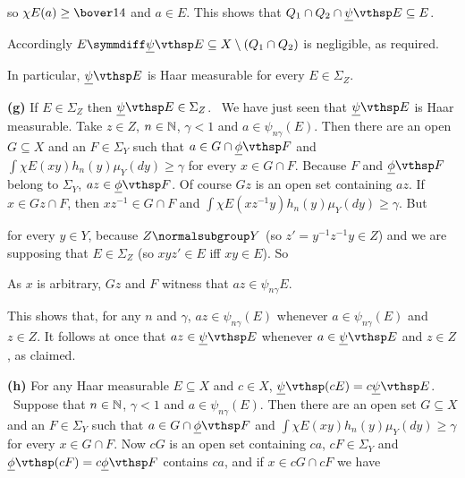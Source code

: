 {

\noindent so $\chi E(a)\ge\bover14$ and $a\in E$.   This shows that
$Q_1\cap Q_2\cap\undpsi E\subseteq E$.

Accordingly $E\symmdiff\undpsi E\subseteq X\setminus(Q_1\cap Q_2)$ is
negligible, as required.\ \QeD\

In particular, $\undpsi E$ is Haar measurable for every $E\in\Sigma_Z$.

\medskip

{\bf (g)} If $E\in\Sigma_Z$ then $\undpsi E\in\Sigma_Z$.   \Prf\ We have just seen that $\undpsi E$ is Haar measurable.   Take
$z\in Z$, $n\in\Bbb N$, $\gamma<1$ and $a\in\psi_{n\gamma}(E)$.   Then
there are an open $G\subseteq X$ and an $F\in\Sigma_Y$ such that $a\in
G\cap\undphi F$ and $\int\chi E(xy)h_n(y)\mu_Y(dy)\ge\gamma$ for
every $x\in G\cap F$.   Because $F$ and $\undphi F$ belong to
$\Sigma_Y$, $az\in\undphi F$.   Of course $Gz$ is an open set containing
$az$.   If $x\in Gz\cap F$, then $xz^{-1}\in G\cap F$ and
$\int\chi E(xz^{-1}y)h_n(y)\mu_Y(dy)\ge\gamma$.   But


\noindent for every $y\in Y$, because $Z\normalsubgroup Y$ (so
$z'=y^{-1}z^{-1}y\in Z$) and we are supposing that $E\in\Sigma_Z$ (so
$xyz'\in E$ iff $xy\in E$).   So


\noindent As $x$ is arbitrary, $Gz$ and $F$ witness that
$az\in\psi_{n\gamma}E$.

This shows that, for any $n$ and $\gamma$, $az\in\psi_{n\gamma}(E)$
whenever $a\in\psi_{n\gamma}(E)$ and $z\in Z$.   It follows at once that
$az\in\undpsi E$ whenever $a\in\undpsi E$ and $z\in Z$, as claimed.\
\Qed

\medskip

{\bf (h)} For any Haar measurable $E\subseteq X$ and $c\in X$,
$\undpsi(cE)=c\undpsi E$.   \Prf\ Suppose that $n\in\Bbb N$, $\gamma<1$
and $a\in\psi_{n\gamma}(E)$.   Then there are an open set $G\subseteq X$
and an $F\in\Sigma_Y$ such that $a\in G\cap\undphi F$ and
$\int\chi E(xy)h_n(y)\mu_Y(dy)\ge\gamma$ for every $x\in G\cap F$.   Now
$cG$ is an open set containing $ca$, $cF\in\Sigma_Y$ and
$\undphi(cF)=c\undphi F$ contains $ca$, and if $x\in cG\cap cF$ we have


}
